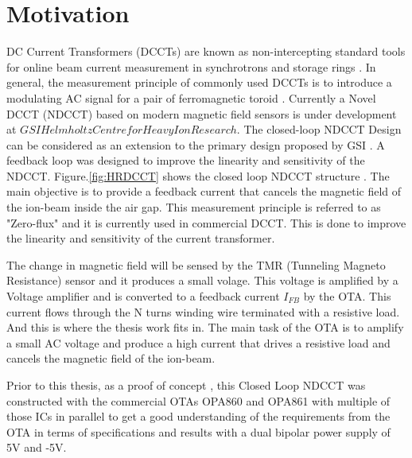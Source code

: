 \vfill
\clearpage

\section{Motivation}

DC Current Transformers (DCCTs) are known as  non-intercepting  standard  tools  for online beam current measurement in synchrotrons and storage rings \cite{sensor_ndcct_gsi}. In general, the measurement principle of commonly used DCCTs is to introduce a modulating AC signal for a pair of ferromagnetic toroid \cite{ndcct_gsi}. Currently a Novel DCCT (NDCCT) based on modern magnetic field sensors is under development at $GSI Helmholtz Centre for Heavy Ion Research$. The closed-loop NDCCT Design can be considered as an extension to the primary design proposed by GSI \cite{ndcct_gsi}. A feedback loop was designed to improve the linearity and sensitivity of the NDCCT. Figure.\ref{fig:HRDCCT} shows the closed loop NDCCT structure \cite{hrdcct}. The main objective is to provide a feedback current that cancels the magnetic field of the ion-beam inside the air gap. This measurement principle is referred to as "Zero-flux" and it is currently used in commercial DCCT.
This is done to improve the linearity and sensitivity of the current transformer.

The change in magnetic field will be sensed by the TMR (Tunneling Magneto Resistance) sensor and it produces a small volage. This voltage is amplified by a Voltage amplifier and is converted to a feedback current $I_{FB}$ by the OTA. This current flows through the N turns winding wire terminated with a resistive load. And this is where the thesis work fits in. The main task of the OTA is to amplify a small AC voltage and produce a high current that drives a resistive load and cancels the magnetic field of the ion-beam.

Prior to this thesis, as a proof of concept \cite{hrdcct}, this Closed Loop NDCCT was constructed with the commercial OTAs OPA860 and OPA861 with multiple of those ICs in parallel to get a good understanding of the requirements from the OTA in terms of specifications and results with a dual bipolar power supply of 5V and -5V.


